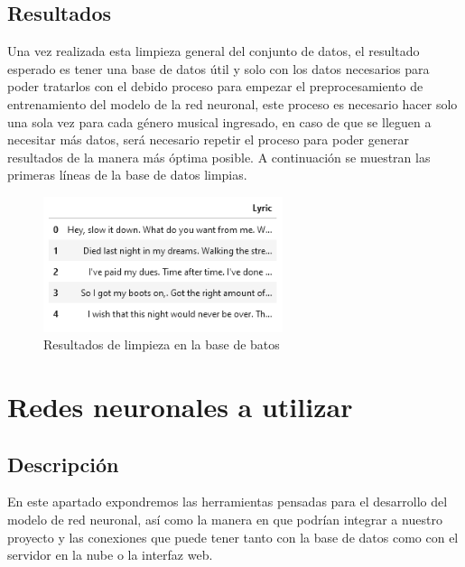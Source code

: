 \documentclass[12pt, a4paper, titlepage]{report}
\begin{document}
		\subsection{Resultados} %
		Una vez realizada esta limpieza general del conjunto de datos, el resultado esperado es tener una base de datos útil y solo con los datos necesarios para poder tratarlos con el debido proceso para empezar el preprocesamiento de entrenamiento del modelo de la red neuronal, este proceso es necesario hacer solo una sola vez para cada género musical ingresado, en caso de que se lleguen a necesitar más datos, será necesario repetir el proceso para poder generar resultados de la manera más óptima posible.
		A continuación se muestran las primeras líneas de la base de datos limpias.
		\begin{figure}[H]
			\includegraphics[width=7cm]{./imagenes/Disenio/Iteracion_2/Base_de_Datos/ResultadosLimpiezaBasedeDatos.png}
			\centering 
			\caption{Resultados de limpieza en la base de batos}
		\end{figure}
\newpage

	\section{Redes neuronales a utilizar} %
		\subsection{Descripción}
		En este apartado expondremos las herramientas pensadas para el desarrollo del modelo de red neuronal, así como la manera en que podrían integrar a nuestro proyecto y las conexiones que puede tener tanto con la base de datos como con el servidor en la nube o la interfaz web. 
\end{document}
